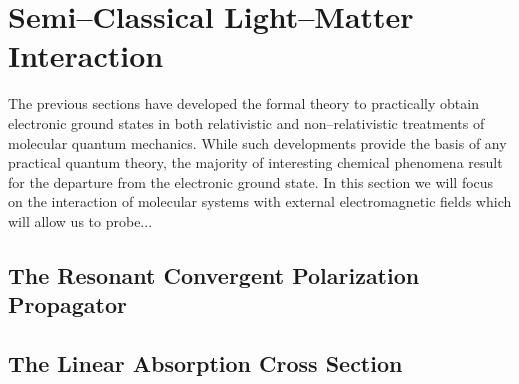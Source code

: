 \section{Semi--Classical Light--Matter Interaction}
\label{sec:SCLMI}


The previous sections have developed the formal theory to practically obtain electronic ground states
in both relativistic and non--relativistic treatments of molecular quantum mechanics. While such
developments provide the basis of any practical quantum theory, the majority of interesting chemical
phenomena result for the departure from the electronic ground state. In this section we will
focus on the interaction of molecular systems with external electromagnetic fields which will
allow us to probe...

\subsection{The Resonant Convergent Polarization Propagator}
\label{sec:PolarProp}

\subsection{The Linear Absorption Cross Section}
\label{sec:AbsorptionTheory}
